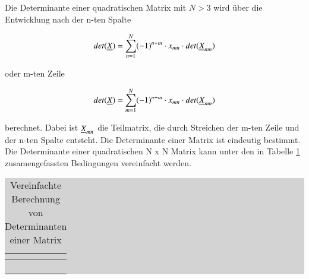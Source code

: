 \noindent Die Determinante einer quadratischen Matrix mit $N > 3$ wird \"{u}ber die Entwicklung nach der n-ten Spalte

\begin{equation}\label{eq:fifteentwentytwo}
det(\underline{X}) = \displaystyle\sum\limits_{n=1}^{N}(-1)^{n+m}\cdot x_{mn}\cdot det(\underline{X}_{mn})
\end{equation}

\noindent oder m-ten Zeile 

\begin{equation}\label{eq:fifteentwentythree}
det(\underline{X}) = \displaystyle\sum\limits_{m=1}^{N}(-1)^{n+m}\cdot x_{mn}\cdot det(\underline{X}_{mn})
\end{equation}

\noindent berechnet. Dabei ist $\underline{X}_{mn}$ die Teilmatrix, die durch Streichen der m-ten Zeile und der n-ten Spalte entsteht. Die Determinante einer Matrix ist eindeutig bestimmt. Die Determinante einer quadratischen N x N Matrix kann unter den in Tabelle \ref{tab:fifteenseven} zusamengefassten Bedingungen vereinfacht werden.

\clearpage

\begin{table}[H]
\setlength{\arrayrulewidth}{.1em}
\caption{Vereinfachte Berechnung von Determinanten einer Matrix}
\setlength{\fboxsep}{0pt}%
\colorbox{lightgray}{%
%
\begin{tabular}{| c | c |}
\hline
\parbox[c][0.3in][c]{3.2in}{\smallskip\centering\textbf{\selectfont{Bedingung}}} & 
\parbox[c][0.3in][c]{3.2in}{\smallskip\centering\textbf{\selectfont{Mathematische Beschreibung}}}\\ \hline

\parbox[c][0.5in][c]{3.2in}{} &
\parbox[c][0.5in][c]{3.2in}{}\\ \hline

\parbox[c][0.4in][c]{3.2in}{} & 
\parbox[c][0.4in][c]{3.2in}{}\\ \hline

\parbox[c][0.4in][c]{3.2in}{} & 
\parbox[c][0.4in][c]{3.2in}{}\\ \hline

\parbox[c][0.4in][c]{3.2in}{} & 
\parbox[c][0.4in][c]{3.2in}{}\\ \hline

\end{tabular}%
}
\label{tab:fifteenseven}
\end{table}

